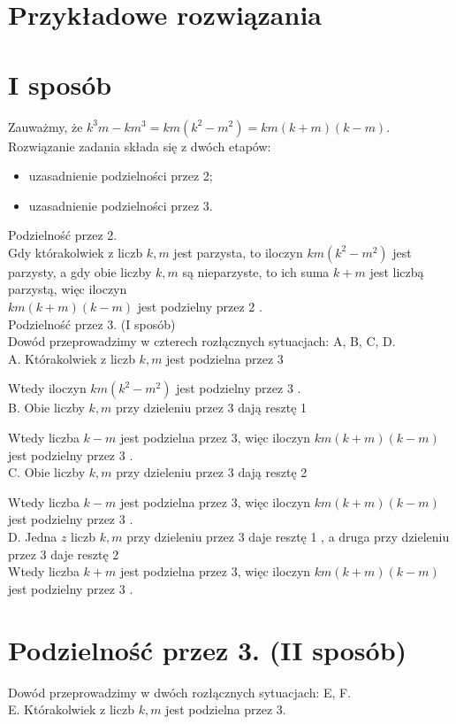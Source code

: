 \documentclass[10pt]{article}
\begin{document}
\section*{Przykładowe rozwiązania}
\section*{I sposób}
Zauważmy, że $k^{3} m-k m^{3}=k m\left(k^{2}-m^{2}\right)=k m(k+m)(k-m)$.\\
Rozwiązanie zadania składa się z dwóch etapów:

\begin{itemize}
  \item uzasadnienie podzielności przez 2;
  \item uzasadnienie podzielności przez 3.
\end{itemize}

Podzielność przez 2.\\
Gdy którakolwiek z liczb $k, m$ jest parzysta, to iloczyn $k m\left(k^{2}-m^{2}\right)$ jest parzysty, a gdy obie liczby $k, m$ są nieparzyste, to ich suma $k+m$ jest liczbą parzystą, więc iloczyn\\
$k m(k+m)(k-m)$ jest podzielny przez 2 .\\
Podzielność przez 3. (I sposób)\\
Dowód przeprowadzimy w czterech rozłącznych sytuacjach: A, B, C, D.\\
A. Którakolwiek z liczb $k, m$ jest podzielna przez 3

Wtedy iloczyn $k m\left(k^{2}-m^{2}\right)$ jest podzielny przez 3 .\\
B. Obie liczby $k, m$ przy dzieleniu przez 3 dają resztę 1

Wtedy liczba $k-m$ jest podzielna przez 3, więc iloczyn $k m(k+m)(k-m)$ jest podzielny przez 3 .\\
C. Obie liczby $k, m$ przy dzieleniu przez 3 dają resztę 2

Wtedy liczba $k-m$ jest podzielna przez 3, więc iloczyn $k m(k+m)(k-m)$ jest podzielny przez 3 .\\
D. Jedna $z$ liczb $k, m$ przy dzieleniu przez 3 daje resztę 1 , a druga przy dzieleniu przez 3 daje resztę 2\\
Wtedy liczba $k+m$ jest podzielna przez 3, więc iloczyn $k m(k+m)(k-m)$ jest podzielny przez 3 .

\section*{Podzielność przez 3. (II sposób)}
Dowód przeprowadzimy w dwóch rozłącznych sytuacjach: E, F.\\
E. Którakolwiek z liczb $k, m$ jest podzielna przez 3.
\end{document}
